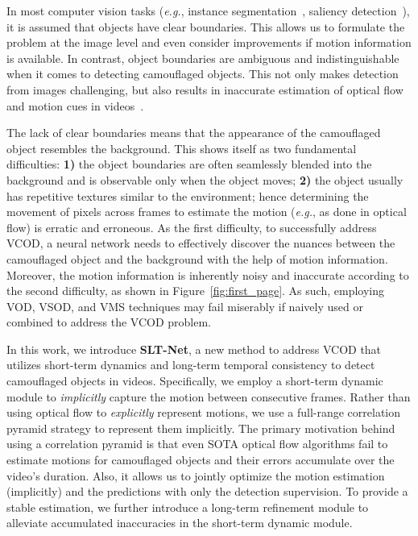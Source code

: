 \documentclass[10pt,twocolumn,letterpaper]{article}
\def\eg{\emph{e.g.}}
\def\Ourmodel{SLT-Net}
\def\figref#1{Figure~\ref{#1}}
\begin{document}
In most computer vision tasks (\eg, instance segmentation~\cite{zhongicpr18}, saliency detection~\cite{Zhang_2021_ICCV}), it is assumed that objects have clear boundaries. This allows us to formulate the problem at the image level and even consider improvements if motion information is available. In contrast, object boundaries are ambiguous and indistinguishable when it comes to detecting camouflaged objects. This not only makes detection from images challenging, but also results in inaccurate estimation of optical flow and motion cues in videos~\cite{NEURIPS2020_add5aebf,Zhong_2019_CVPR,Wang_2021_CVPR}. 

The lack of clear boundaries means that the appearance of the camouflaged object resembles the background. This shows itself as two fundamental difficulties: \textbf{1)} the object boundaries are often seamlessly blended into the background and is observable only when the object moves; 
\textbf{2)} the object usually has repetitive textures similar to the environment; hence determining the movement of pixels across frames to estimate the motion (\eg, as done in optical flow) is erratic and erroneous. As the first difficulty, to successfully address VCOD, a neural network needs to effectively discover the nuances between the camouflaged object and the background with the help of motion information. Moreover, the motion information is inherently noisy and inaccurate according to the second difficulty, as shown in \figref{fig:first_page}. As such, employing VOD, VSOD, and VMS techniques may fail miserably if naively used or combined to address the VCOD problem.

In this work, we introduce \textbf{\Ourmodel}, a new method to address VCOD that utilizes short-term dynamics and long-term temporal consistency to detect camouflaged objects in videos. 
Specifically, we employ a short-term dynamic module to \textit{implicitly} capture the motion between consecutive frames. Rather than using optical flow to \textit{explicitly} represent motions, we use a full-range correlation pyramid strategy to represent them implicitly. The primary motivation behind using a correlation pyramid is that even SOTA optical flow algorithms fail to estimate motions for camouflaged objects and their errors accumulate over the video's duration. Also, it allows us to jointly optimize the motion estimation (implicitly) and the predictions with only the detection supervision.
To provide a stable estimation, we further introduce a long-term refinement module to alleviate accumulated inaccuracies in the short-term dynamic module.
\end{document}
